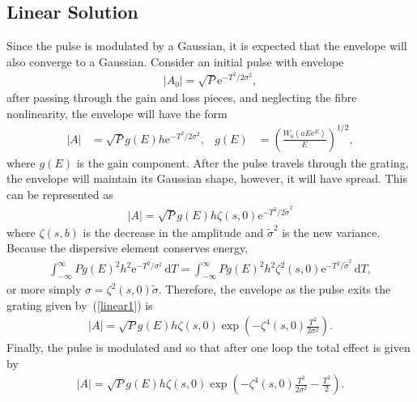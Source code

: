 \documentclass[12pt]{article}
\providecommand{\df}{\textrm{d}}
\begin{document}
\subsection{Linear Solution}
Since the pulse is modulated by a Gaussian, it is expected that the envelope will also converge 
to a Gaussian.  Consider an initial pulse with envelope
\begin{align*}
	|A_0| = \sqrt{P} \textrm{e}^{-T^2 / 2 \sigma^2},
\end{align*}
after passing through the gain and loss pieces, and neglecting the fibre nonlinearity, the envelope 
will have the form
\begin{align*}
	|A| &= \sqrt{P} g(E) h \textrm{e}^{-T^2 / 2 \sigma^2},&
	g(E) &= \left( \frac{W_0(a E \textrm{e}^E)}{E} \right)^{1/2},
\end{align*}
where $g(E)$ is the gain component. After the pulse travels through the grating, the envelope will 
maintain its Gaussian shape, however, it will have spread. This can be represented as
\begin{align}
\label{linear1}
	|A| = \sqrt{P} g(E) h \zeta(s, 0) \textrm{e}^{-T^2 / 2 \tilde{\sigma}^2}
\end{align}
where $\zeta(s, b)$ is the decrease in the amplitude and $\widetilde{\sigma}^2$ is the new variance. 
Because the dispersive element conserves energy,
\begin{align*}
	\int_{-\infty}^{\infty} P g(E)^2 h^2 \textrm{e}^{-T^2 / \sigma^2} \, \df T = 
	\int_{-\infty}^{\infty} P g(E)^2 h^2 \zeta^2(s, 0) \textrm{e}^{-T^2 / \widetilde{\sigma}^2} \, \df T,
\end{align*}
or more simply $\sigma = \zeta^2(s, 0) \widetilde{\sigma}$.
Therefore, the envelope as the pulse exits the grating given by~(\ref{linear1}) is
\begin{align*}
	|A| = \sqrt{P} g(E) h \zeta(s, 0) \exp \left( -\zeta^4(s, 0) \frac{T^2}{2 \sigma^2} \right).
\end{align*}
Finally, the pulse is modulated and so that after one loop the total effect is given by
\begin{align}
\label{linear2}
	|A| = \sqrt{P} g(E) h \zeta(s, 0) \exp \left( -\zeta^4(s, 0) \frac{T^2}{2 \sigma^2} - \frac{T^2}{2} \right).
\end{align}
\end{document}
